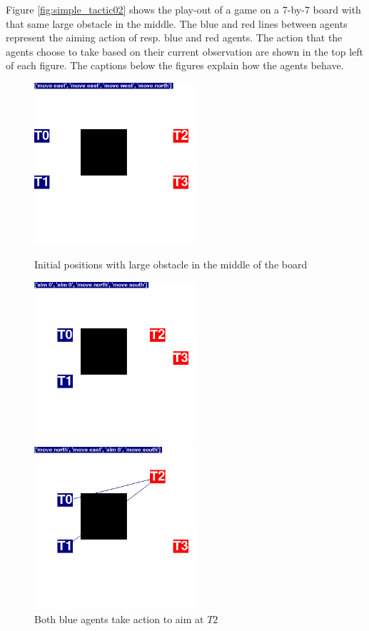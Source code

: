 Figure \ref{fig:simple_tactic02} shows the play-out of a game on a 7-by-7 board with that same large obstacle in the middle. The blue and red lines between agents represent the aiming action of resp. blue and red agents. The action that the agents choose to take based on their current observation are shown in the top left of each figure. The captions below the figures explain how the agents behave.

\begin{figure}
\centering
\begin{minipage}{.45\textwidth}
  \centering
  \includegraphics[width=6cm]{images/iteration/screenshot01.png}
  \caption*{Initial positions with large obstacle in the middle of the board}
\end{minipage}%
\begin{minipage}{.1\textwidth}
\centering
  \caption*{ }
\end{minipage}%
\begin{minipage}{.45\textwidth}
  \centering
  \includegraphics[width=6cm]{images/iteration/screenshot02.png}
  \caption*{Both blue agents take action to aim at $T2$}
\end{minipage}
\centering
\begin{minipage}{.45\textwidth}
  \centering
  \includegraphics[width=6cm]{images/iteration/screenshot03.png}

\end{minipage}
\end{figure}
